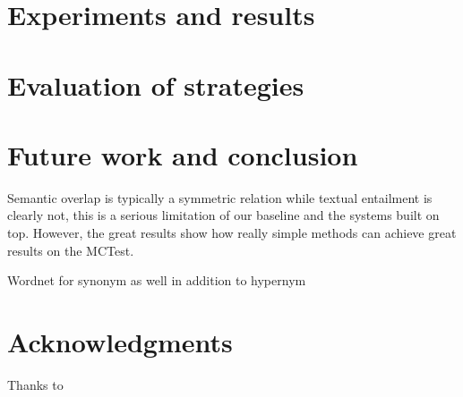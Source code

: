 \documentclass[11pt]{article}
\begin{document}
\section{Experiments and results}

\section{Evaluation of strategies}

\section{Future work and conclusion}

Semantic overlap is typically a symmetric relation while textual entailment is clearly not, this is a serious limitation of our baseline and the systems built on top.
However, the great results show how really simple methods can achieve great results on the MCTest.

Wordnet for synonym as well in addition to hypernym

\section*{Acknowledgments}
Thanks to



\end{document}
